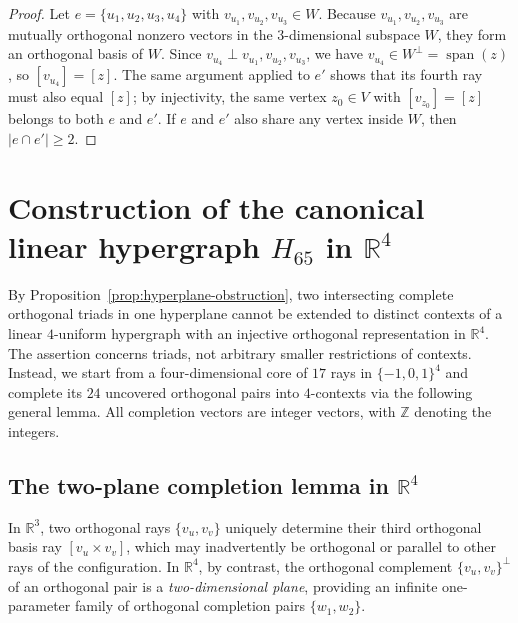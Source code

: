 \documentclass[
  aps,
  pra,
  reprint,
  superscriptaddress,
  amsmath,
  amssymb,
  nofootinbib,
  floatfix
]{revtex4-2}
\theoremstyle{definition}
\theoremstyle{remark}
\newcommand{\R}{\mathbb{R}}
\DeclareMathOperator{\spanop}{span}
\begin{document}
\begin{proof}
Let $e=\{u_1,u_2,u_3,u_4\}$ with $v_{u_1},v_{u_2},v_{u_3}\in W$. Because $v_{u_1},v_{u_2},v_{u_3}$ are mutually orthogonal nonzero vectors in the $3$-dimensional subspace $W$, they form an orthogonal basis of $W$. Since $v_{u_4}\perp v_{u_1},v_{u_2},v_{u_3}$, we have $v_{u_4}\in W^\perp=\spanop(z)$, so $[v_{u_4}]=[z]$. The same argument applied to $e'$ shows that its fourth ray must also equal $[z]$; by injectivity, the same vertex $z_0\in V$ with $[v_{z_0}]=[z]$ belongs to both $e$ and $e'$. If $e$ and $e'$ also share any vertex inside $W$, then $|e\cap e'|\ge2$.
\end{proof}

\section{Construction of the canonical linear hypergraph \texorpdfstring{$H_{65}$}{H\_65} in \texorpdfstring{$\R^4$}{R4}}

By Proposition~\ref{prop:hyperplane-obstruction}, two intersecting complete orthogonal triads in one hyperplane cannot be extended to distinct contexts of a linear $4$-uniform hypergraph with an injective orthogonal representation in $\R^4$. The assertion concerns triads, not arbitrary smaller restrictions of contexts. Instead, we start from a four-dimensional core of $17$ rays in $\{-1,0,1\}^4$ and complete its $24$ uncovered orthogonal pairs into $4$-contexts via the following general lemma. All completion vectors are integer vectors, with $\mathbb{Z}$ denoting the integers.

\subsection{The two-plane completion lemma in \texorpdfstring{$\R^4$}{R4}}

In $\R^3$, two orthogonal rays $\{v_u,v_v\}$ uniquely determine their third orthogonal basis ray $[v_u\times v_v]$, which may inadvertently be orthogonal or parallel to other rays of the configuration. In $\R^4$, by contrast, the orthogonal complement $\{v_u,v_v\}^\perp$ of an orthogonal pair is a \emph{two-dimensional plane}, providing an infinite one-parameter family of orthogonal completion pairs $\{w_1,w_2\}$.
\end{document}
